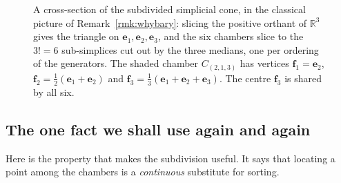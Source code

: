 \documentclass[11pt,a4paper]{article}
\theoremstyle{definition}
\theoremstyle{plain}
\newcommand{\R}{\mathbb{R}}
\newcommand{\bvec}[1]{\mathbf{#1}}
\begin{document}
\begin{figure}[h]
\centering
{}
\caption{A cross-section of the subdivided simplicial cone, in the classical
picture of Remark~\ref{rmk:whybary}: slicing the positive orthant of $\R^3$
gives the triangle on $\bvec e_1,\bvec e_2,\bvec e_3$, and the six chambers
slice to the $3!=6$ sub-simplices cut out by the three medians, one per
ordering of the generators. The shaded chamber $C_{(2,1,3)}$ has vertices
$\bvec f_1=\bvec e_2$, $\bvec f_2=\tfrac12(\bvec e_1{+}\bvec e_2)$ and $\bvec
f_3=\tfrac13(\bvec e_1{+}\bvec e_2{+}\bvec e_3)$. The centre $\bvec f_3$ is
shared by all six.}
\label{fig:sd}
\end{figure}

\subsection{The one fact we shall use again and again}

Here is the property that makes the subdivision useful. It says that locating a
point among the chambers is a \emph{continuous} substitute for sorting.
\end{document}
